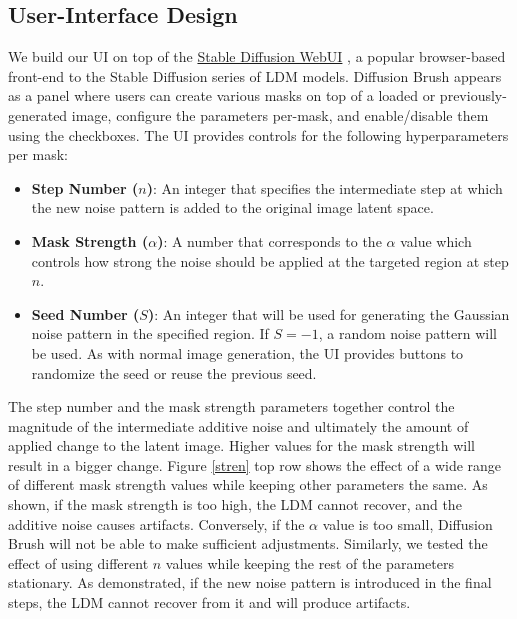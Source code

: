 \documentclass[10pt,twocolumn,letterpaper]{article}
\begin{document}






\subsection{User-Interface Design}
\label{ui}

We build our UI on top of the \href{https://github.com/AUTOMATIC1111/stable-diffusion-webui}{Stable Diffusion WebUI} \cite{SDWUI}, a popular browser-based front-end to the Stable Diffusion series of LDM models. Diffusion Brush appears as a panel where users can create various masks on top of a loaded or previously-generated image, configure the parameters per-mask, and enable/disable them using the checkboxes. The UI provides controls for the following hyperparameters per mask:
\begin{itemize}

\item \textbf{Step Number ($n$)}: An integer that specifies the intermediate step at which the new noise pattern is added to the original image latent space.
\item \textbf{Mask Strength ($\alpha$)}: A number that corresponds to the $\alpha$ value which controls how strong the noise should be applied at the targeted region at step $n$.
\item \textbf{Seed Number ($S$)}: An integer that will be used for generating the Gaussian noise pattern in the specified region. If $S=-1$, a random noise pattern will be used. As with normal image generation, the UI provides buttons to randomize the seed or reuse the previous seed.

\end{itemize}
The step number and the mask strength parameters together control the magnitude of the intermediate additive noise and ultimately the amount of applied change to the latent image.
Higher values for the mask strength will result in a bigger change. Figure \ref{stren} top row shows the effect of a wide range of different mask strength values while keeping other parameters the same. As shown, if the mask strength is too high, the LDM cannot recover, and the additive noise causes artifacts. Conversely, if the $\alpha$ value is too small, Diffusion Brush will not be able to make sufficient adjustments. Similarly, we tested the effect of using different $n$ values while keeping the rest of the parameters stationary. As demonstrated, if the new noise pattern is introduced in the final steps, the LDM cannot recover from it and will produce artifacts.
\end{document}
